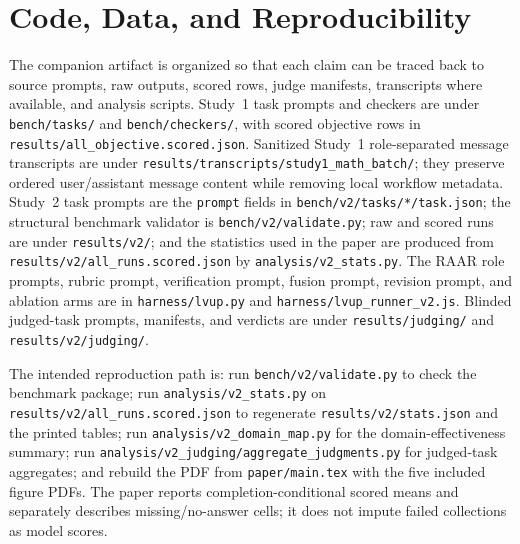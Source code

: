 \documentclass[journal]{IEEEtran}
\begin{document}
\section{Code, Data, and Reproducibility}
\label{sec:reproducibility}
The companion artifact is organized so that each claim can be traced back to
source prompts, raw outputs, scored rows, judge manifests, transcripts where
available, and analysis scripts. Study~1 task prompts and checkers are under
\texttt{bench/tasks/} and \texttt{bench/checkers/}, with scored objective rows
in \texttt{results/all\_objective.scored.json}. Sanitized Study~1
role-separated message transcripts are under
\texttt{results/transcripts/study1\_math\_batch/}; they preserve ordered
user/assistant message content while removing local workflow metadata. Study~2
task prompts are the
\texttt{prompt} fields in \texttt{bench/v2/tasks/*/task.json}; the structural
benchmark validator is \texttt{bench/v2/validate.py}; raw and scored runs are
under \texttt{results/v2/}; and the statistics used in the paper are produced
from \texttt{results/v2/all\_runs.scored.json} by
\texttt{analysis/v2\_stats.py}. The RAAR role prompts, rubric prompt,
verification prompt, fusion prompt, revision prompt, and ablation arms are in
\texttt{harness/lvup.py} and \texttt{harness/lvup\_runner\_v2.js}. Blinded
judged-task prompts, manifests, and verdicts are under
\texttt{results/judging/} and \texttt{results/v2/judging/}.

The intended reproduction path is: run \texttt{bench/v2/validate.py} to check
the benchmark package; run \texttt{analysis/v2\_stats.py} on
\texttt{results/v2/all\_runs.scored.json} to regenerate
\texttt{results/v2/stats.json} and the printed tables; run
\texttt{analysis/v2\_domain\_map.py} for the domain-effectiveness summary;
run \texttt{analysis/v2\_judging/aggregate\_judgments.py} for judged-task
aggregates; and rebuild the PDF from \texttt{paper/main.tex} with the five
included figure PDFs. The paper reports completion-conditional scored means
and separately describes missing/no-answer cells; it does not impute failed
collections as model scores.
\end{document}
